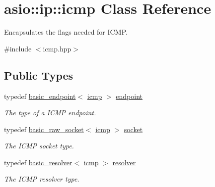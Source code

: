 \hypertarget{classasio_1_1ip_1_1icmp}{}\section{asio\+:\+:ip\+:\+:icmp Class Reference}
\label{classasio_1_1ip_1_1icmp}


Encapsulates the flags needed for I\+C\+M\+P.  




{\ttfamily \#include $<$icmp.\+hpp$>$}

\subsection*{Public Types}
\begin{DoxyCompactItemize}
\item 
typedef \hyperlink{classasio_1_1ip_1_1basic__endpoint}{basic\+\_\+endpoint}$<$ \hyperlink{classasio_1_1ip_1_1icmp}{icmp} $>$ \hyperlink{classasio_1_1ip_1_1icmp_a3b92dc29eb90413d1dc80966c2d4b6ae}{endpoint}
\begin{DoxyCompactList}\small\item\em The type of a I\+C\+M\+P endpoint. \end{DoxyCompactList}\item 
typedef \hyperlink{classasio_1_1basic__raw__socket}{basic\+\_\+raw\+\_\+socket}$<$ \hyperlink{classasio_1_1ip_1_1icmp}{icmp} $>$ \hyperlink{classasio_1_1ip_1_1icmp_a97be192e262054c0adee620d89b9feab}{socket}
\begin{DoxyCompactList}\small\item\em The I\+C\+M\+P socket type. \end{DoxyCompactList}\item 
typedef \hyperlink{classasio_1_1ip_1_1basic__resolver}{basic\+\_\+resolver}$<$ \hyperlink{classasio_1_1ip_1_1icmp}{icmp} $>$ \hyperlink{classasio_1_1ip_1_1icmp_a326f93699ba9f42654917e676fd967aa}{resolver}
\begin{DoxyCompactList}\small\item\em The I\+C\+M\+P resolver type. \end{DoxyCompactList}\end{DoxyCompactItemize}
